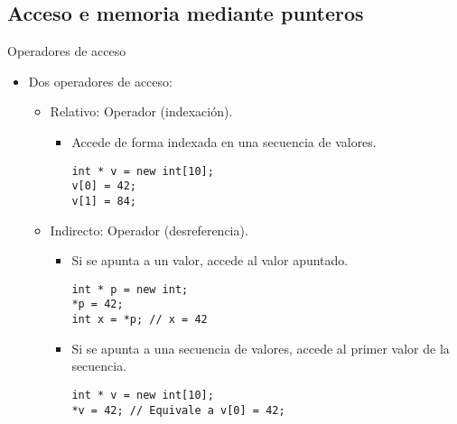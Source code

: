 \subsection{Acceso e memoria mediante punteros}

\begin{frame}[fragile]{Operadores de acceso}
\begin{itemize}
  \item Dos operadores de acceso:
    \begin{itemize}
      \item \alert{Relativo}: Operador \cppkey{[]} (indexación).
        \begin{itemize}
          \item Accede de forma indexada en una secuencia de valores.
\begin{lstlisting}
int * v = new int[10];
v[0] = 42;
v[1] = 84;
\end{lstlisting}
        \end{itemize}

      \item \alert{Indirecto}: Operador \cppkey{*} (desreferencia).
        \begin{itemize}
          \item Si se apunta a un valor, accede al valor apuntado.
\begin{lstlisting}
int * p = new int;
*p = 42;
int x = *p; // x = 42
\end{lstlisting}

          \item Si se apunta a una secuencia de valores, accede al primer valor de la secuencia.
\begin{lstlisting}
int * v = new int[10];
*v = 42; // Equivale a v[0] = 42;
\end{lstlisting}
        \end{itemize}
    \end{itemize}
\end{itemize}
\end{frame}


